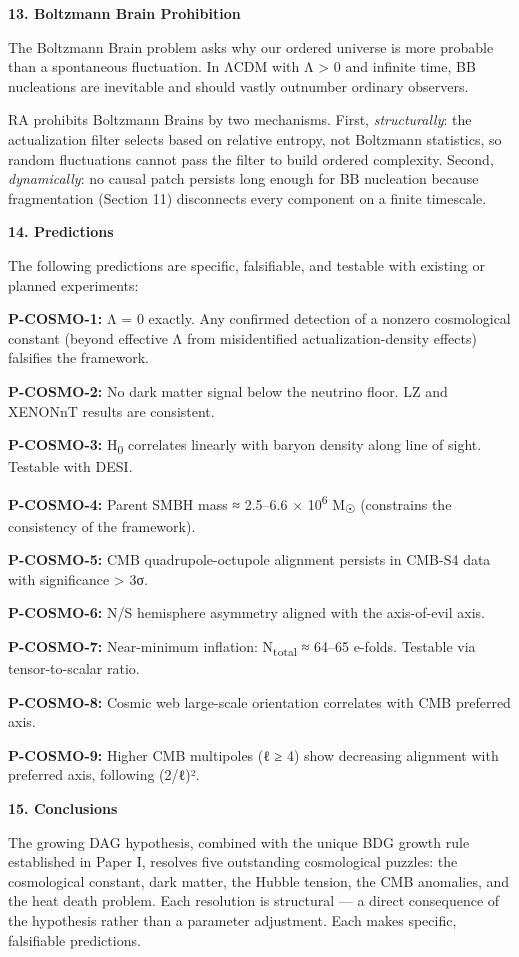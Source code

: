 \documentclass[12pt,a4paper]{article}
\begin{document}
\textbf{13. Boltzmann Brain Prohibition}

The Boltzmann Brain problem asks why our ordered universe is more
probable than a spontaneous fluctuation. In ΛCDM with Λ \textgreater{} 0
and infinite time, BB nucleations are inevitable and should vastly
outnumber ordinary observers.

RA prohibits Boltzmann Brains by two mechanisms. First,
\emph{structurally}: the actualization filter selects based on relative
entropy, not Boltzmann statistics, so random fluctuations cannot pass
the filter to build ordered complexity. Second, \emph{dynamically}: no
causal patch persists long enough for BB nucleation because
fragmentation (Section 11) disconnects every component on a finite
timescale.

\textbf{14. Predictions}

The following predictions are specific, falsifiable, and testable with
existing or planned experiments:

\textbf{P-COSMO-1:} Λ = 0 exactly. Any confirmed detection of a nonzero
cosmological constant (beyond effective Λ from misidentified
actualization-density effects) falsifies the framework.

\textbf{P-COSMO-2:} No dark matter signal below the neutrino floor. LZ
and XENONnT results are consistent.

\textbf{P-COSMO-3:} H\textsubscript{0} correlates linearly with baryon
density along line of sight. Testable with DESI.

\textbf{P-COSMO-4:} Parent SMBH mass ≈ 2.5--6.6 × 10\textsuperscript{6}
M\textsubscript{☉} (constrains the consistency of the framework).

\textbf{P-COSMO-5:} CMB quadrupole-octupole alignment persists in CMB-S4
data with significance \textgreater{} 3σ.

\textbf{P-COSMO-6:} N/S hemisphere asymmetry aligned with the
axis-of-evil axis.

\textbf{P-COSMO-7:} Near-minimum inflation: N\textsubscript{total} ≈
64--65 e-folds. Testable via tensor-to-scalar ratio.

\textbf{P-COSMO-8:} Cosmic web large-scale orientation correlates with
CMB preferred axis.

\textbf{P-COSMO-9:} Higher CMB multipoles (ℓ ≥ 4) show decreasing
alignment with preferred axis, following (2/ℓ)².

\textbf{15. Conclusions}

The growing DAG hypothesis, combined with the unique BDG growth rule
established in Paper I, resolves five outstanding cosmological puzzles:
the cosmological constant, dark matter, the Hubble tension, the CMB
anomalies, and the heat death problem. Each resolution is structural ---
a direct consequence of the hypothesis rather than a parameter
adjustment. Each makes specific, falsifiable predictions.
\end{document}
